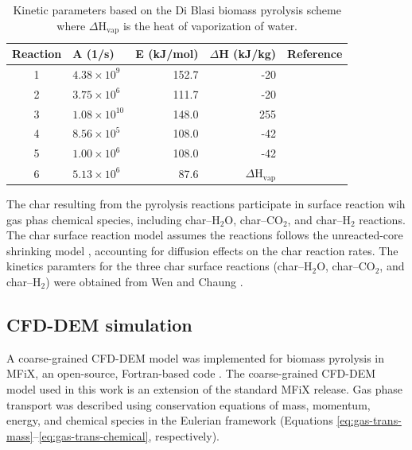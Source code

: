 \documentclass{article}
\begin{document}
\begin{table}[H]
    \centering
    \caption{Kinetic parameters based on the Di Blasi biomass pyrolysis scheme where $\Delta$H$_\text{vap}$ is the heat of vaporization of water.}
    \begin{tabular}{clrrr}
        \toprule
        Reaction & A (1/s) & E (kJ/mol) & $\Delta$H (kJ/kg) & Reference \\
        \midrule
        1 & $4.38 \times 10^9$    & 152.7 & -20                    & \cite{Blasi-2001} \\
        2 & $3.75 \times 10^6$    & 111.7 & -20                    & \cite{Blasi-2001} \\
        3 & $1.08 \times 10^{10}$ & 148.0 & 255                    & \cite{Blasi-2001} \\
        4 & $8.56 \times 10^5$    & 108.0 & -42                    & \cite{Blasi-1993,lu2020bridging} \\
        5 & $1.00 \times 10^6$    & 108.0 & -42                    & \cite{Blasi-1993} \\
        6 & $5.13 \times 10^6$    & 87.6  & $\Delta$H$_\text{vap}$ & \cite{Chan-1985} \\
        \bottomrule
    \end{tabular}
    \label{tab:kinetic-params}
\end{table}

\noindent The char resulting from the pyrolysis reactions participate in surface reaction wih gas phas chemical species, including char--H$_2$O, char--CO$_2$, and char--H$_2$ reactions. The char surface reaction model assumes the reactions follows the unreacted-core shrinking model \cite{Chyou-2013}, accounting for diffusion effects on the char reaction rates. The kinetics paramters for the three char surface reactions (char--H$_2$O, char--CO$_2$, and char--H$_2$) were obtained from Wen and Chaung \cite{Wen1979entr}.

\subsection{CFD-DEM simulation}

A coarse-grained CFD-DEM model was implemented for biomass pyrolysis in MFiX, an open-source, Fortran-based code \cite{Syamlal-1993}. The coarse-grained CFD-DEM model used in this work is an extension of the standard MFiX release. Gas phase transport was described using conservation equations of mass, momentum, energy, and chemical species in the Eulerian framework (Equations \ref{eq:gas-trans-mass}--\ref{eq:gas-trans-chemical}, respectively).
\end{document}

